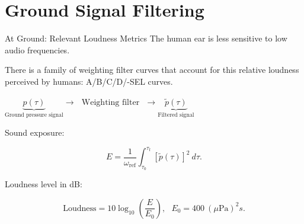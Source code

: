 \documentclass{beamer}
\newcounter{sectionframes}
\newcommand{\setsectionframes}[1]{%
  \setcounter{sectionframes}{#1}%
}
\newcounter{sectionframecount}
\begin{document}
\section{Ground Signal Filtering}

\setsectionframes{3}


\begin{frame}[t]{At Ground: Relevant Loudness Metrics}
\vspace{-10pt}
The human ear is less sensitive to low audio frequencies.

\vspace{10pt}
There is a family of weighting filter curves that account for this relative loudness perceived by humans: A/B/C/D/-SEL curves.

{
\vspace{10pt}
$\underbrace{p(\tau)}_{\text{Ground pressure signal}}\to~~~\text{Weighting filter}~~~\to\underbrace{\tilde{p}(\tau)}_{\text{Filtered signal}}$
}

{
\vspace{10pt}
Sound exposure:

\begin{equation}
  E = \dfrac{1}{\omega_{\text{ref}}}\int_{\tau_0}^{\tau_{\text{f}}} [\tilde{p}(\tau)]^2~d\tau.
\end{equation}
}

{
\vspace{4pt}
Loudness level in dB:

\begin{equation}
  \text{Loudness} = 10\log_{10}\left(\dfrac{E}{E_0}\right),~~~ E_0 = 400~ (\mu\text{Pa})^2s.
\end{equation}
}

\end{frame}

\end{document}
